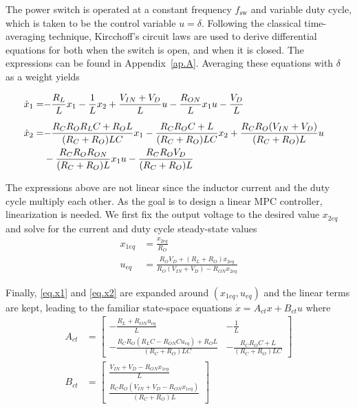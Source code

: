 The power switch is operated at a constant frequency $f_{\text{sw}}$ and variable duty cycle, which is taken to be the control variable $u = \delta$. Following the classical time-averaging technique, Kircchoff's circuit laws are used to derive differential equations for both when the switch is open, and when it is closed. The expressions can be found in Appendix~\ref{ap.A}. Averaging these equations with $\delta$ as a weight yields

\begin{subequations}
	\begin{flalign}
		\dot{x}_1 = & \small{-\frac{R_L}{L}x_1 - \frac{1}{L}x_2 + \frac{V_{IN}+V_D}{L}u - \frac{R_{ON}}{L} x_1 u - \frac{V_D}{L} \label{eq.x1}} && \\[5pt]
		\dot{x}_2 = & \small{-\frac{R_C R_O R_L C + R_O L}{(R_C + R_O) L C}x_1 -\frac{R_C R_O C + L}{(R_C + R_O)L C}} x_2 + \frac{R_C R_O (V_{IN} + V_D)}{(R_C+R_O)L} u  &&\nonumber \\
		&- \frac{R_C R_O R_{ON}}{(R_C + R_O)L} x_1 u - \frac{R_C R_O V_D}{(R_C + R_O)L} \label{eq.x2} && 
	\end{flalign}
\end{subequations}

The expressions above are not linear since the inductor current and the duty cycle multiply each other. As the goal is to design a linear MPC controller, linearization is needed. We first fix the output voltage to the desired value $x_{2eq}$ and solve for the current and duty cycle steady-state values
%
\begin{align}
	x_{1eq} &= \frac{x_{2eq}}{R_O} \label{eq.x1eq}\\[5pt]
	u_{eq} &= \frac{R_O V_D + (R_L + R_O) x_{2eq}}{R_O(V_{IN}+V_D)-R_{ON} x_{2eq}} \label{eq.ueq}
\end{align}

Finally, \eqref{eq.x1} and \eqref{eq.x2} are expanded around $(x_{1eq},u_{eq})$ and the linear terms are kept, leading to the familiar state-space equations
$\dot{x} = A_{ct} x + B_{ct} u$ where
\begin{align}
	A_{ct} & = \begin{bmatrix} 
		-\frac{R_L+R_{ON} u_{eq}}{L} & -\frac{1}{L} \\[5pt]
		-\frac{R_C R_O (R_L C - R_{ON} C u_{eq}) + R_O L}{(R_C + R_O) L C} & -\frac{R_C R_O C + L}{(R_C+R_O) L C}
	\end{bmatrix} 
	\\[5pt]
	B_{ct} & = \begin{bmatrix} 
		\frac{V_{IN} + V_D - R_{ON} x_{1eq}}{L} \\[5pt]
		\frac{R_C R_O(V_{IN}+V_D-R_{ON}x_{1eq})}{(R_C+R_O)L}
	\end{bmatrix}
\end{align}


